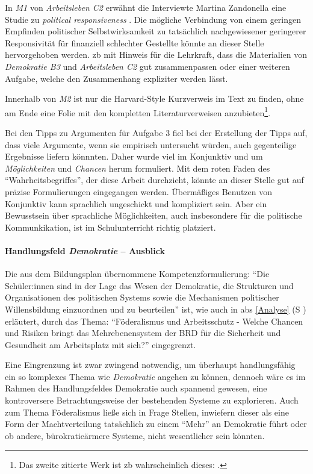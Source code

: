 In \emph{M1} von \emph{Arbeitsleben C2} erwähnt die Interviewte Martina Zandonella eine Studie zu \emph{political responsiveness} \autocite[]{Elsasser.2017}. Die mögliche Verbindung von einem geringen Empfinden politischer Selbstwirksamkeit zu tatsächlich nachgewiesener geringerer Responsivität für finanziell schlechter Gestellte \autocite{Elsasser.2017} könnte an dieser Stelle hervorgehoben werden. \Gls{zb} mit Hinweis für die Lehrkraft, dass die Materialien von \emph{Demokratie B3} und \emph{Arbeitsleben C2} gut zusammenpassen oder einer weiteren Aufgabe, welche den Zusammenhang expliziter werden lässt. 

Innerhalb von \emph{M2} ist nur die Harvard-Style Kurzverweis im Text zu finden, ohne am Ende eine Folie mit den kompletten Literaturverweisen anzubieten\footnote{
    Das zweite zitierte Werk ist \gls{zb} wahrscheinlich dieses: \textcite[]{Probst.2022}.}. 

Bei den Tipps zu Argumenten für Aufgabe 3 fiel bei der Erstellung der Tipps auf, dass viele Argumente, wenn sie empirisch untersucht würden, auch gegenteilige Ergebnisse liefern könnnten. Daher wurde viel im Konjunktiv und um \emph{Möglichkeiten} und \emph{Chancen} herum formuliert. Mit dem roten Faden des \enquote{Wahrheitsbegriffes}, der diese Arbeit durchzieht, könnte an dieser Stelle gut auf präzise Formulierungen eingegangen werden.
Übermäßiges Benutzen von Konjunktiv kann sprachlich ungeschickt und kompliziert sein. Aber ein Bewusstsein über sprachliche Möglichkeiten, auch insbesondere für die politische Kommunkikation, ist im Schulunterricht richtig platziert. 



\paragraph{Handlungsfeld \emph{Demokratie} -- Ausblick} %
Die aus dem Bildungsplan übernommene Kompetenzformulierung: \enquote{Die Schüler:innen sind in der Lage das Wesen der Demokratie, die Strukturen und Organisationen des politischen Systems sowie die Mechanismen politischer Willensbildung einzuordnen und zu beurteilen}
ist, wie auch in \gls{abs} \ref{Analyse} (\gls{S} \pageref{Analyse}) erläutert, durch das Thema: \enquote{Föderalismus und Arbeitsschutz - Welche Chancen und Risiken bringt das Mehrebenensystem der BRD für die Sicherheit und Gesundheit am Arbeitsplatz mit sich?} eingegrenzt. 

Eine Eingrenzung ist zwar zwingend notwendig, um überhaupt handlungsfähig ein so komplexes Thema wie \emph{Demokratie} angehen zu können, dennoch wäre es im Rahmen des Handlungsfeldes Demokratie auch spannend gewesen, eine kontroversere Betrachtungsweise der bestehenden Systeme zu explorieren. Auch zum Thema Föderalismus ließe sich in Frage Stellen, inwiefern dieser als eine Form der Machtverteilung tatsächlich zu einem \enquote{Mehr} an Demokratie führt oder ob andere, bürokratieärmere Systeme, nicht wesentlicher sein könnten. 

